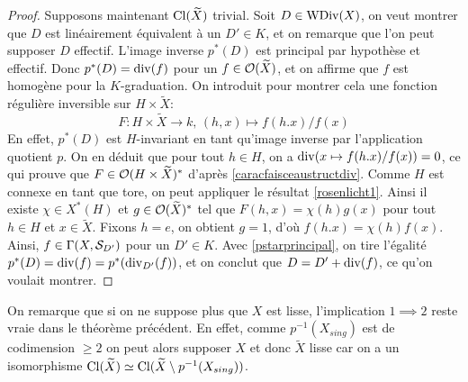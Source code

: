 \begin{proof}
Supposons maintenant $\operatorname{Cl}(\widetilde{X})$ trivial. Soit $D\in\operatorname{WDiv}(X)$, on veut montrer que $D$ est linéairement équivalent à un $D'\in K$, et on remarque que l'on peut supposer $D$ effectif. L'image inverse $p^*(D)$ est principal par hypothèse et effectif. Donc $p^*(D)=\operatorname{div}(f)$ pour un $f\in \mathcal{O}(\widetilde{X})$, et on affirme que $f$ est homogène pour la $K$-graduation. On introduit pour montrer cela une fonction régulière inversible sur $H\times \widetilde{X}$:
$$F:H\times \widetilde{X}\rightarrow k,\,(h,x)\mapsto f(h.x)/f(x)$$
En effet, $p^*(D)$ est $H$-invariant en tant qu'image inverse par l'application quotient $p$. On en déduit que pour tout $h\in H$, on a $\operatorname{div}(x\mapsto f(h.x)/f(x))=0$, ce qui prouve que $F\in \mathcal{O}(H\times \widetilde{X})^*$ d'après \ref{caracfaisceaustructdiv}. Comme $H$ est connexe en tant que tore, on peut appliquer le résultat \ref{rosenlicht1}. Ainsi il existe $\chi \in X^*(H)$ et $g\in\mathcal{O}(\widetilde{X})^*$ tel que $F(h,x)=\chi(h)g(x)$ pour tout $h\in H$ et $x\in \widetilde{X}$. Fixons $h=e$, on obtient $g=1$, d'où $f(h.x)=\chi(h)f(x)$. Ainsi, $f\in \Gamma(X, \mathcal{S}_{D'})$ pour un $D'\in K$. Avec \ref{pstarprincipal}, on tire l'égalité $p^*(D)=\operatorname{div}(f)=p^*(\operatorname{div}_{D'}(f))$, et on conclut que $D=D'+\operatorname{div}(f)$, ce qu'on voulait montrer.

\end{proof}

\begin{rem}
On remarque que si on ne suppose plus que $X$ est lisse, l'implication $1\implies 2$ reste vraie dans le théorème précédent. En effet, comme $p^{-1}(X_{sing})$ est de codimension $\geq 2$ on peut alors supposer $X$ et donc $\widetilde{X}$ lisse car on a un isomorphisme $\operatorname{Cl}(\widetilde{X})\simeq\operatorname{Cl}(\widetilde{X}\setminus p^{-1}(X_{sing}))$. 
\end{rem}


